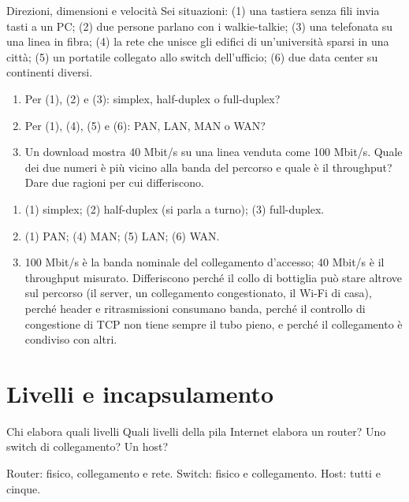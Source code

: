 \begin{esercizio}{Direzioni, dimensioni e velocità}
Sei situazioni: (1) una tastiera senza fili invia tasti a un PC; (2) due persone parlano con i walkie-talkie; (3) una telefonata su una
linea in fibra; (4) la rete che unisce gli edifici di un'università sparsi in una città; (5) un portatile collegato allo switch
dell'ufficio; (6) due data center su continenti diversi.
\begin{enumerate}[label=(\alph*)]
    \item Per (1), (2) e (3): simplex, half-duplex o full-duplex?
    \item Per (1), (4), (5) e (6): PAN, LAN, MAN o WAN?
    \item Un download mostra 40 Mbit/s su una linea venduta come 100 Mbit/s. Quale dei due numeri è più vicino alla banda del percorso e
          quale è il throughput? Dare due ragioni per cui differiscono.
\end{enumerate}

\svolgimento
\begin{enumerate}[label=(\alph*)]
    \item (1) simplex; (2) half-duplex (si parla a turno); (3) full-duplex.
    \item (1) PAN; (4) MAN; (5) LAN; (6) WAN.
    \item 100 Mbit/s è la banda nominale del collegamento d'accesso; 40 Mbit/s è il throughput misurato. Differiscono perché il collo di
          bottiglia può stare altrove sul percorso (il server, un collegamento congestionato, il Wi-Fi di casa), perché header e
          ritrasmissioni consumano banda, perché il controllo di congestione di TCP non tiene sempre il tubo pieno, e perché il
          collegamento è condiviso con altri.
\end{enumerate}
\end{esercizio}

\section{Livelli e incapsulamento}

\begin{esercizio}{Chi elabora quali livelli}
Quali livelli della pila Internet elabora un router? Uno switch di collegamento? Un host?

\svolgimento
Router: fisico, collegamento e rete. Switch: fisico e collegamento. Host: tutti e cinque.
\end{esercizio}

